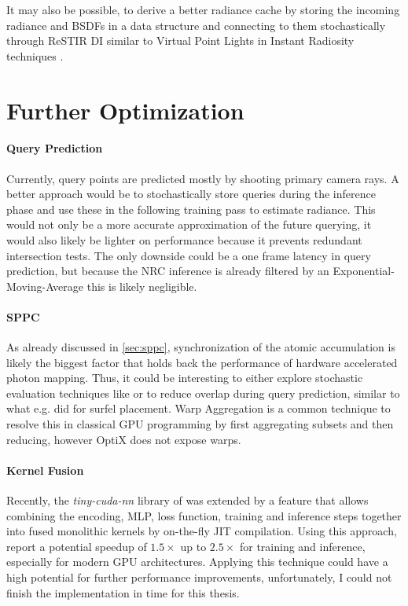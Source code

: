 It may also be possible, to derive a better radiance cache by storing the incoming radiance and BSDFs in a data structure and connecting to them stochastically through ReSTIR DI \parencite{bitterli2020} similar to Virtual Point Lights in Instant Radiosity techniques \parencite{keller1997}.

\section{Further Optimization}

\paragraph{Query Prediction}
Currently, query points are predicted mostly by shooting primary camera rays.
A better approach would be to stochastically store queries during the inference phase and use these in the following training pass to estimate radiance.
This would not only be a more accurate approximation of the future querying, it would also likely be lighter on performance because it prevents redundant intersection tests.
The only downside could be a one frame latency in query prediction, but because the NRC inference is already filtered by an Exponential-Moving-Average this is likely negligible.

\paragraph{SPPC} As already discussed in \cref{sec:sppc}, synchronization of the atomic accumulation is likely the biggest factor that holds back the performance of hardware accelerated photon mapping.
Thus, it could be interesting to either explore stochastic evaluation techniques like \textcite{kern2023} or to reduce overlap during query prediction, similar to what e.g. \textcite{stachowiak2018} did for surfel placement.
Warp Aggregation is a common technique to resolve this in classical GPU programming by first aggregating subsets and then reducing, however OptiX does not expose warps.

\paragraph{Kernel Fusion} Recently, the \emph{tiny-cuda-nn} library of \textcite{muller2021a} was extended by a feature that allows combining the encoding, MLP, loss function, training and inference steps together into fused monolithic kernels by on-the-fly JIT compilation.
Using this approach, \textcite{muller2021a} report a potential speedup of $1.5\times$ up to $2.5\times$ for training and inference, especially for modern GPU architectures.
Applying this technique could have a high potential for further performance improvements, unfortunately, I could not finish the implementation in time for this thesis.